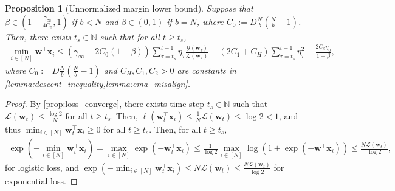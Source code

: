 \documentclass{article} %
\theoremstyle{plain}
\newtheorem{proposition}[theorem]{Proposition}
\theoremstyle{definition}
\theoremstyle{remark}
\def\gG{{\mathcal{G}}}
\newcommand{\Ls}{\mathcal{L}}
\def\bx{{\mathbf x}}
\def\bw{{\mathbf w}}
\begin{document}
\begin{proposition}[Unnormalized margin lower bound]\label{prop:unnormalized_margin}
    Suppose that $\beta\in(1-\tfrac{\gamma_\infty}{4C_0}, 1)$ if $b<N$ and $\beta\in(0, 1)$ if $b=N$, where $C_0:=D \tfrac Nb (\tfrac Nb -1)$. Then, there exists $t_s\in \mathbb N$ such that for all $t\geq t_s$,
    \begin{align*}
        \min_{i\in [N]}\bw^\top \bx_i \leq (\gamma_\infty - 2C_0(1-\beta)) \sum_{\tau=t_s}^{t-1} \eta_\tau \frac{\gG(\bw_\tau)}{\Ls(\bw_\tau)} - (2C_1+C_H)\sum_{\tau=t_s}^{t-1}\eta_\tau^2 -\frac{2C_2\eta_0}{1-\beta},
    \end{align*}
    where $C_0:=D \tfrac Nb (\tfrac Nb -1)$ and $C_H,C_1, C_2>0$ are constants in \cref{lemma:descent_inequality,lemma:ema_misalign}.
\end{proposition}
\begin{proof}
    By \cref{prop:loss_converge}, there exists time step $t_s\in \mathbb N$ such that $\Ls (\bw_t) \leq \frac{\log 2}{N}$ for all $t\geq t_s$. Then, $\ell(\bw_t^\top \bx_i) \leq \tfrac 1N \Ls (\bw_t) \leq \log 2 < 1$, and thus $\min_{i\in [N]} \bw_t^\top \bx_i \geq 0$ for all $t\geq t_s$. Then, for all $t\geq t_s$,
    \begin{align*}
        \exp(-\min_{i\in [N]} \bw_t^\top \bx_i) = \max_{i\in [N]} \exp(-\bw_t^\top \bx_i) \leq \frac{1}{\log 2} \max_{i\in [N]} \log (1 + \exp(-\bw^\top \bx_i)) \leq \frac{N \Ls(\bw_t)}{\log 2},
    \end{align*}
    for logistic loss, and $\exp(-\min_{i\in [N]} \bw_t^\top \bx_i) \leq N\Ls(\bw_t) \leq \frac{N \Ls(\bw_t)}{\log 2}$ for exponential loss.


\end{proof}
\end{document}
